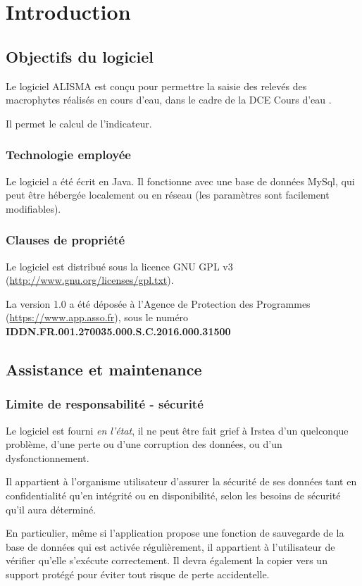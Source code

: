 \chapter{Introduction}

\section{Objectifs du logiciel}
Le logiciel ALISMA est conçu pour permettre la saisie des relevés des macrophytes réalisés en cours d'eau, dans le cadre de la DCE \og Cours d'eau \fg{}. 

Il permet le calcul de l'indicateur.
\subsection{Technologie employée}
Le logiciel a été écrit en Java. Il fonctionne avec une base de données MySql, qui peut être hébergée localement ou en réseau (les paramètres sont facilement modifiables).
\subsection{Clauses de propriété}
Le logiciel est distribué sous la licence GNU GPL v3 (\url{http://www.gnu.org/licenses/gpl.txt}).

La version 1.0 a été déposée à l'Agence de Protection des Programmes (\url{https://www.app.asso.fr}), sous le numéro \textbf{IDDN.FR.001.270035.000.S.C.2016.000.31500}

\section{Assistance et maintenance}

\subsection{Limite de responsabilité - sécurité}

Le logiciel est fourni \textit{en l'état}, il ne peut être fait grief à Irstea d'un quelconque problème, d'une perte ou d'une corruption des données, ou d'un dysfonctionnement.

Il appartient à l'organisme utilisateur d'assurer la sécurité de ses données tant en confidentialité qu'en intégrité ou en disponibilité, selon les besoins de sécurité qu'il aura déterminé. 

En particulier, même si l'application propose une fonction de sauvegarde de la base de données qui est activée régulièrement, il appartient à l'utilisateur de vérifier qu'elle s'exécute correctement. Il devra également la copier vers un support protégé pour éviter tout risque de perte accidentelle.

